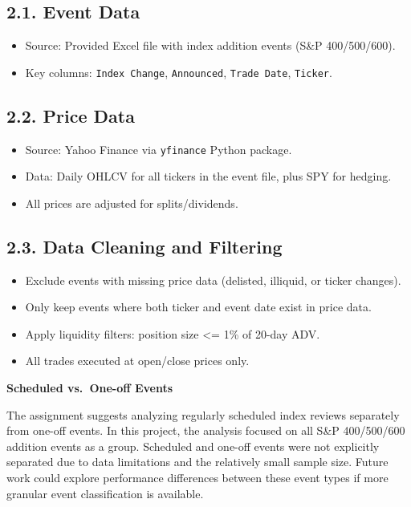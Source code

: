 \documentclass[11pt]{article}
\providecommand{\tightlist}{%
      \setlength{\itemsep}{0pt}\setlength{\parskip}{0pt}}
\begin{document}
\subsection*{2.1. Event Data}\label{event-data}

\begin{itemize}
\tightlist
\item
  Source: Provided Excel file with index addition events (S\&P
  400/500/600).
\item
  Key columns: \texttt{Index\ Change}, \texttt{Announced},
  \texttt{Trade\ Date}, \texttt{Ticker}.
\end{itemize}

\subsection*{2.2. Price Data}\label{price-data}

\begin{itemize}
\tightlist
\item
  Source: Yahoo Finance via \texttt{yfinance} Python package.
\item
  Data: Daily OHLCV for all tickers in the event file, plus SPY for
  hedging.
\item
  All prices are adjusted for splits/dividends.
\end{itemize}

\subsection*{2.3. Data Cleaning and Filtering}\label{data-cleaning-and-filtering}

\begin{itemize}
\tightlist
\item
  Exclude events with missing price data (delisted, illiquid, or ticker
  changes).
\item
  Only keep events where both ticker and event date exist in price data.
\item
  Apply liquidity filters: position size \textless= 1\% of 20-day ADV.
\item
  All trades executed at open/close prices only.
\end{itemize}

\textbf{Scheduled vs.~One-off Events}

The assignment suggests analyzing regularly scheduled index reviews
separately from one-off events. In this project, the analysis focused on
all S\&P 400/500/600 addition events as a group. Scheduled and one-off
events were not explicitly separated due to data limitations and the
relatively small sample size. Future work could explore performance
differences between these event types if more granular event
classification is available.
\end{document}
